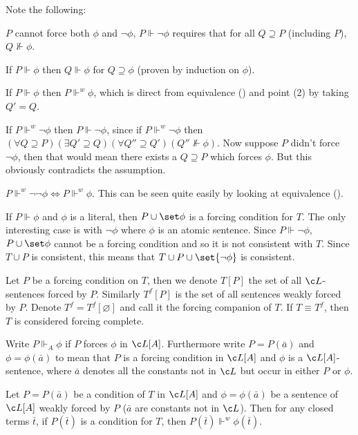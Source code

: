 Note the following:
\benum
    \item $P$ cannot force both $\phi$ and $\neg\phi$, $P\Vdash\neg\phi$ requires that for all $Q\supseteq P$ (including $P$), $Q\nVdash\phi$.
    \item If $P\Vdash\phi$ then $Q\Vdash\phi$ for $Q\supseteq\phi$ (proven by induction on $\phi$).
    \item If $P\Vdash\phi$ then $P\Vdash^w\phi$, which is direct from equivalence (\wforce) and point (2) by taking $Q'=Q$.
    \item If $P\Vdash^w\neg\phi$ then $P\Vdash\neg\phi$, since if $P\Vdash^w\neg\phi$ then $(\forall Q\supseteq P)(\exists Q'\supseteq Q)(\forall Q''\supseteq Q')(Q''\nVdash\phi)$.
    Now suppose $P$ didn't force $\neg\phi$, then that would mean there exists a $Q\supseteq P$ which forces $\phi$.
    But this obviously contradicts the assumption.
    \item $P\Vdash^w\neg\neg\phi\iff P\Vdash^w\phi$.
    This can be seen quite easily by looking at equivalence (\wforce).
    \item If $P\Vdash\phi$ and $\phi$ is a literal, then $P\cup\set\phi$ is a forcing condition for $T$.
    The only interesting case is with $\neg\phi$ where $\phi$ is an atomic sentence.
    Since $P\Vdash\neg\phi$, $P\cup\set\phi$ cannot be a forcing condition and so it is not consistent with $T$.
    Since $T\cup P$ is consistent, this means that $T\cup P\cup\set{\neg\phi}$ is consistent.
\eenum

\bdefn

    Let $P$ be a forcing condition on $T$, then we denote $T[P]$ the set of all $\c L$-sentences forced by $P$.
    Similarly $T^f[P]$ is the set of all sentences weakly forced by $P$.
    Denote $T^f=T^f[\varnothing]$ and call it the {\emphcolor forcing companion} of $T$.
    If $T\equiv T^f$, then $T$ is considered {\emphcolor forcing complete}.

\edefn

Write $P\Vdash_A\phi$ if $P$ forces $\phi$ in $\c L[A]$.
Furthermore write $P=P(\bar a)$ and $\phi=\phi(\bar a)$ to mean that $P$ is a forcing condition in $\c L[A]$ and $\phi$ is a $\c L[A]$-sentence, where $\bar a$ denotes all the constants not in $\c L$ but
occur in either $P$ or $\phi$.

\blemm

    Let $P=P(\bar a)$ be a condition of $T$ in $\c L[A]$ and $\phi=\phi(\bar a)$ be a sentence of $\c L[A]$ weakly forced by $P$ ($\bar a$ are constants not in $\c L$).
    Then for any closed terms $\bar t$, if $P(\bar t)$ is a condition for $T$, then $P(\bar t)\Vdash^w\phi(\bar t)$.

